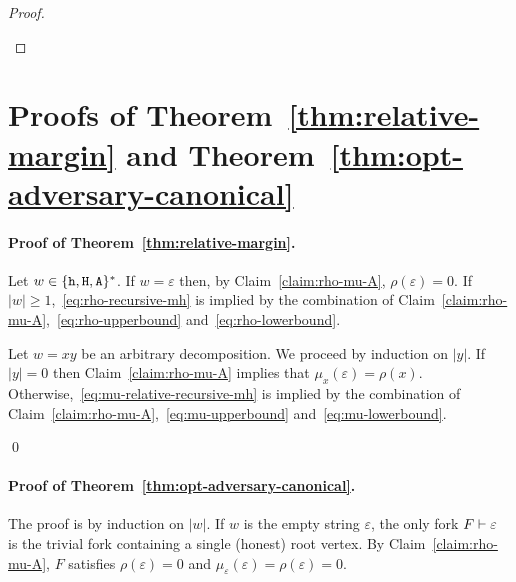 \begin{proof}
\begin{description}[font=\normalfont\itshape\space]
    \end{description}
\end{proof}






\section{Proofs of Theorem~\ref{thm:relative-margin} and Theorem~\ref{thm:opt-adversary-canonical}}
\label{sec:relative-margin-thm-proof}\label{sec:opt-adversary-thm-proof}



\paragraph{Proof of Theorem~\ref{thm:relative-margin}.}
Let $w \in \{\mathtt{h}, \mathtt{H}, \mathtt{A}\}^*$. 
If $w = \varepsilon$ then, by Claim~\ref{claim:rho-mu-A}, 
$\rho(\varepsilon) = 0$. 
If $|w| \geq 1$,~\eqref{eq:rho-recursive-mh} is implied by 
the combination of 
Claim~\ref{claim:rho-mu-A},~\eqref{eq:rho-upperbound} and~\eqref{eq:rho-lowerbound}. 


Let $w = xy$ be an arbitrary decomposition. 
We proceed by induction on $|y|$. 
If $|y| = 0$ then 
Claim~\ref{claim:rho-mu-A} implies that $\mu_x(\varepsilon) = \rho(x)$. 
Otherwise,~\eqref{eq:mu-relative-recursive-mh} 
is implied by the combination of 
Claim~\ref{claim:rho-mu-A},~\eqref{eq:mu-upperbound} and~\eqref{eq:mu-lowerbound}.

\hfill\qed


\paragraph{Proof of Theorem~\ref{thm:opt-adversary-canonical}.}
The proof is by induction on $|w|$. 
If $w$ is the empty string $\varepsilon$, 
the only fork $F \vdash \varepsilon$ is the trivial fork 
containing a single (honest) root vertex. 
By Claim~\ref{claim:rho-mu-A}, 
$F$ satisfies $\rho(\varepsilon) = 0$ 
and 
$\mu_\varepsilon(\varepsilon) = \rho(\varepsilon) = 0$.

